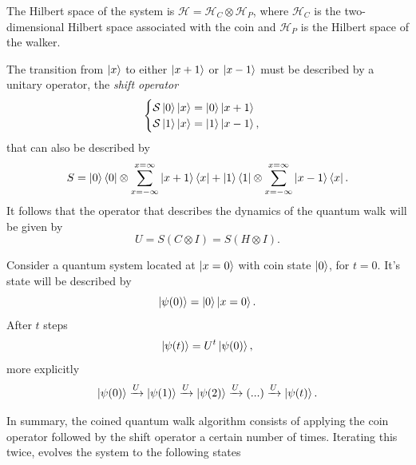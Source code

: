 \documentclass[../../dissertation.tex]{subfiles}
\begin{document}
The Hilbert space of the system is $\mathscr{H} = \mathscr{H}_{C} \otimes
\mathscr{H}_{P}$, where $\mathscr{H}_{C}$ is the two-dimensional Hilbert space
associated with the coin and $\mathscr{H}_P$ is the Hilbert space of the
walker.\par The transition from $\ket{x}$ to either $\ket{x+1}$ or $\ket{x-1}$
must be described by a unitary operator, the \textit{shift operator} 
\begin{equation}
	\begin{cases}
		\mathcal{S} \ket{0}\ket{x} = \ket{0}\ket{x+1}\\
		\mathcal{S} \ket{1}\ket{x} = \ket{1}\ket{x-1},
	\end{cases}
\end{equation}
that can also be described by
\begin{equation}
	S = \ket{0}\bra{0} \otimes \sum_{x=-\infty}^{x=\infty} \ket{x+1}\bra{x} + \ket{1}\bra{1}\otimes \sum_{x=-\infty}^{x=\infty} \ket{x-1}\bra{x}.
	\label{eq:coinedShiftOperator}
\end{equation}
It follows that the operator that describes the dynamics of the quantum walk
will be given by 
\begin{equation}
	U = S(C\otimes I) = S(H\otimes I). 
	\label{eq:coinedUnmarkedOperator}
\end{equation}\par
Consider a quantum system located at $\ket{x = 0}$ with coin state $\ket{0}$,
for $t=0$. It's state will be described by
\begin{equation}
	\ket{\psi(0)} = \ket{0}\ket{x=0}.
	\label{eq:coinedQWInitCond0}
\end{equation}
After $t$ steps 
\begin{equation}
	\ket{\psi(t)}=U^{t}\ket{\psi(0)},
\end{equation}
more explicitly
\begin{equation}
	\ket{\psi(0)}\xrightarrow[]{\text{$U$}}\ket{\psi(1)}\xrightarrow[]{\text{$U$}}\ket{\psi(2)}\xrightarrow[]{\text{$U$}} (...) \xrightarrow[]{\text{$U$}}\ket{\psi(t)}.
\end{equation}\par
In summary, the coined quantum walk algorithm consists of applying the coin
operator followed by the shift operator a certain number of times. Iterating
this twice, evolves the system to the following states
\end{document}
